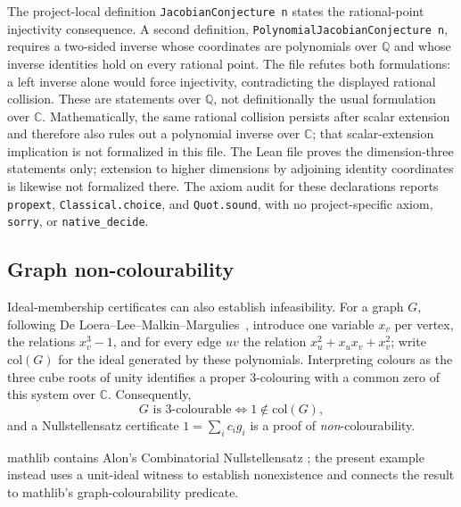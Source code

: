 \documentclass[11pt]{article}
\newcommand{\mathlib}{\textsf{mathlib}}
\newcommand{\QQ}{\mathbb{Q}}
\newcommand{\CC}{\mathbb{C}}
\newcommand{\code}[1]{\texttt{#1}}
\begin{document}
The project-local definition \code{JacobianConjecture n} states the
rational-point injectivity consequence.  A second definition,
\code{PolynomialJacobianConjecture n}, requires a two-sided inverse whose
coordinates are polynomials over $\QQ$ and whose inverse identities hold
on every rational point.  The file refutes both formulations: a left
inverse alone would force injectivity, contradicting the displayed
rational collision.  These are statements over $\QQ$, not definitionally
the usual formulation over $\CC$.  Mathematically, the same rational
collision persists after scalar extension and therefore also rules out a
polynomial inverse over $\CC$; that scalar-extension implication is not
formalized in this file.  The Lean file proves the dimension-three
statements only; extension to higher dimensions by adjoining identity
coordinates is likewise not formalized there.  The axiom audit for these declarations reports
\code{propext}, \code{Classical.choice}, and \code{Quot.sound}, with no
project-specific axiom, \code{sorry}, or \code{native\_decide}.

\subsection{Graph non-colourability}\label{sec:coloring}

Ideal-membership certificates can also establish infeasibility.  For
a graph $G$, following De Loera--Lee--Malkin--Margulies~\cite{nulla},
introduce one variable $x_v$ per vertex, the relations $x_v^3-1$, and
for every edge $uv$ the relation
$x_u^2+x_ux_v+x_v^2$; write $\mathrm{col}(G)$ for the ideal generated
by these polynomials.  Interpreting colours as the three cube roots of
unity identifies a proper $3$-colouring with a common zero of this
system over $\CC$.  Consequently,
\[
  G \text{ is $3$-colourable} \iff 1 \notin \mathrm{col}(G),
\]
and a Nullstellensatz certificate $1 = \sum_i c_i g_i$ is a proof of
\emph{non}-colourability.

\mathlib{} contains Alon's Combinatorial Nullstellensatz
\cite{alon-cn}; the present example instead uses a unit-ideal witness
to establish nonexistence and connects the result to \mathlib{}'s
graph-colourability predicate.
\end{document}
